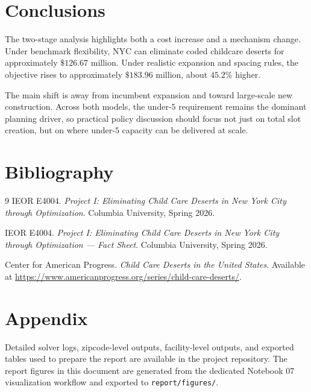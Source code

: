 \documentclass[11pt]{article}
\newcommand{\1}{\mathbb{I}}
\begin{document}
\section*{Conclusions}

The two-stage analysis highlights both a cost increase and a mechanism change. Under benchmark flexibility, NYC can eliminate coded childcare deserts for approximately \(\$126.67\) million. Under realistic expansion and spacing rules, the objective rises to approximately \(\$183.96\) million, about \(45.2\%\) higher.

The main shift is away from incumbent expansion and toward large-scale new construction. Across both models, the under-\(5\) requirement remains the dominant planning driver, so practical policy discussion should focus not just on total slot creation, but on where under-\(5\) capacity can be delivered at scale.

\section*{Bibliography}

\begin{thebibliography}{9}
IEOR E4004. \emph{Project I: Eliminating Child Care Deserts in New York City through Optimization}. Columbia University, Spring 2026.

IEOR E4004. \emph{Project I: Eliminating Child Care Deserts in New York City through Optimization --- Fact Sheet}. Columbia University, Spring 2026.

Center for American Progress. \emph{Child Care Deserts in the United States}. Available at \url{https://www.americanprogress.org/series/child-care-deserts/}.
\end{thebibliography}

\appendix

\section*{Appendix}

Detailed solver logs, zipcode-level outputs, facility-level outputs, and exported tables used to prepare the report are available in the project repository.
The report figures in this document are generated from the dedicated Notebook 07 visualization workflow and exported to \texttt{report/figures/}.

\end{document}
